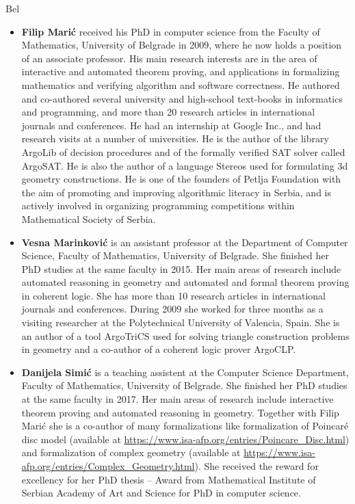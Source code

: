 \begin{sitedescription}{Bel}
\begin{itemize}
  \item{\bf Filip Marić} received his PhD in computer science from the
    Faculty of Mathematics, University of Belgrade in 2009, where he
    now holds a position of an associate professor. His main research
    interests are in the area of interactive and automated theorem
    proving, and applications in formalizing mathematics and verifying
    algorithm and software correctness. He authored and co-authored
    several university and high-school text-books in informatics and
    programming, and more than 20 research articles in international
    journals and conferences. He had an internship at Google Inc., and
    had research visits at a number of universities. He is the author
    of the library ArgoLib of decision procedures and of the formally
    verified SAT solver called ArgoSAT. He is also the author of a
    language Stereos used for formulating 3d geometry
    constructions. He is one of the founders of Petlja Foundation with
    the aim of promoting and improving algorithmic literacy in Serbia,
    and is actively involved in organizing programming competitions
    within Mathematical Society of Serbia.

  \item{\bf Vesna Marinković} is an assistant professor at the
    Department of Computer Science, Faculty of Mathematics, University
    of Belgrade. She finished her PhD studies at the same faculty in
    2015. Her main areas of research include automated reasoning in
    geometry and automated and formal theorem proving in coherent
    logic. She has more than 10 research articles in international
    journals and conferences. During 2009 she worked for three months
    as a visiting researcher at the Polytechnical University of
    Valencia, Spain. She is an author of a tool ArgoTriCS used for
    solving triangle construction problems in geometry and a co-author
    of a coherent logic prover ArgoCLP.

  \item{\bf Danijela Simić} is a teaching assistent at the Computer
    Science Department, Faculty of Mathematics, University of
    Belgrade. She finished her PhD studies at the same faculty in
    2017. Her main areas of research include interactive theorem
    proving and automated reasoning in geometry. Together with Filip
    Marić she is a co-author of many formalizations like formalization
    of Poincaré disc model (available at
    \url{https://www.isa-afp.org/entries/Poincare_Disc.html}) and
    formalization of complex geometry (available at
    \url{https://www.isa-afp.org/entries/Complex_Geometry.html}). She
    received the reward for excellency for her PhD thesis -- Award
    from Mathematical Institute of Serbian Academy of Art and Science
    for PhD in computer science.
  

\end{itemize}
\end{sitedescription}
